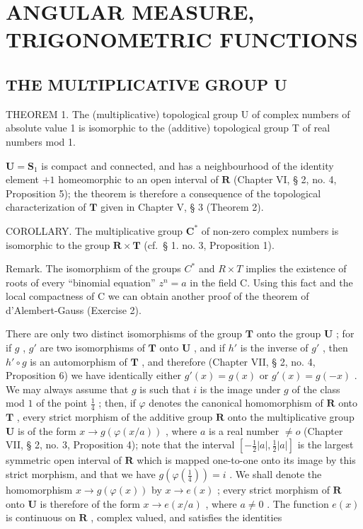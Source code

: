 \section{ANGULAR MEASURE, TRIGONOMETRIC FUNCTIONS}

\subsection{THE MULTIPLICATIVE GROUP U}

THEOREM 1. The (multiplicative) topological group U of complex numbers of absolute value 1 is isomorphic to the (additive) topological group T of real numbers mod 1.

\(\mathbf{U} = \mathbf{S}_{1}\) is compact and connected, and has a neighbourhood of the identity element \(+1\) homeomorphic to an open interval of \(\mathbf{R}\) (Chapter VI, § 2, no. 4, Proposition 5); the theorem is therefore a consequence of the topological characterization of \(\mathbf{T}\) given in Chapter V, § 3 (Theorem 2).

COROLLARY. The multiplicative group \(\mathbf{C}^*\) of non-zero complex numbers is isomorphic to the group \(\mathbf{R} \times \mathbf{T}\) (cf.~§ 1. no. 3, Proposition 1).

Remark. The isomorphism of the groups \(C^{*}\) and \(R \times T\) implies the existence of roots of every ``binomial equation'' \(z^{n} = a\) in the field C. Using this fact and the local compactness of C we can obtain another proof of the theorem of d'Alembert-Gauss (Exercise 2).

There are only two distinct isomorphisms of the group \(\mathbf{T}\) onto the group \(\mathbf{U}\) ; for if \(g\) , \(g'\) are two isomorphisms of \(\mathbf{T}\) onto \(\mathbf{U}\) , and if \(h'\) is the inverse of \(g'\) , then \(h' \circ g\) is an automorphism of \(\mathbf{T}\) , and therefore (Chapter VII, § 2, no. 4, Proposition 6) we have identically either \(g'(x) = g(x)\) or \(g'(x) = g(-x)\) . We may always assume that \(g\) is such that \(i\) is the image under \(g\) of the class mod \(1\) of the point \(\frac{1}{4}\) ; then, if \(\varphi\) denotes the canonical homomorphism of \(\mathbf{R}\) onto \(\mathbf{T}\) , every strict morphism of the additive group \(\mathbf{R}\) onto the multiplicative group \(\mathbf{U}\) is of the form \(x \to g(\varphi(x/a))\) , where \(a\) is a real number \(\neq o\) (Chapter VII, § 2, no. 3, Proposition 4); note that the interval \([- \frac{1}{2} |a|, \frac{1}{2} |a|]\) is the largest symmetric open interval of \(\mathbf{R}\) which is mapped one-to-one onto its image by this strict morphism, and that we have \(g(\varphi(\frac{1}{4})) = i\) . We shall denote the homomorphism \(x \to g(\varphi(x))\) by \(x \to e(x)\) ; every strict morphism of \(\mathbf{R}\) onto \(\mathbf{U}\) is therefore of the form \(x \to e(x/a)\) , where \(a \neq 0\) . The function \(e(x)\) is continuous on \(\mathbf{R}\) , complex valued, and satisfies the identities


